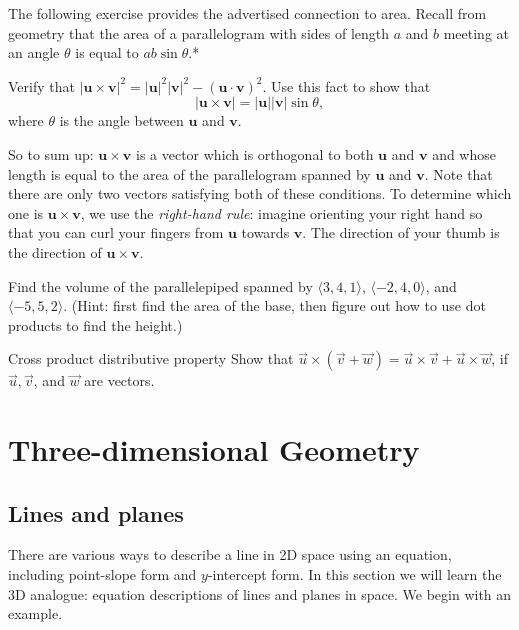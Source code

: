 \documentclass{watsonbook}
\begin{document}
The following exercise provides the advertised connection to
area. Recall from geometry that the area of a parallelogram with sides
of length $a$ and $b$ meeting at an angle $\theta$ is equal to $ab\sin
\theta$.*

\begin{exercise}{}{}
Verify that $|\mathbf{u} \times \mathbf{v}|^2 =
|\mathbf{u}|^2|\mathbf{v}|^2 - (\mathbf{u}\cdot \mathbf{v})^2$. Use this fact to
show that 
\[
|\mathbf{u} \times \mathbf{v}| = |\mathbf{u}||\mathbf{v}|\sin\theta,
\]
where $\theta$ is the angle between $\mathbf{u}$ and $\mathbf{v}$. 
\end{exercise}

So to sum up: $\mathbf{u}  \times \mathbf{v}$ is a vector which is
orthogonal to both $\mathbf{u}$ and $\mathbf{v}$ and whose length
is equal to the area of the parallelogram spanned by $\mathbf{u}$ and
$\mathbf{v}$. Note that there are only two vectors satisfying both of
these conditions. To determine which one is $\mathbf{u}  \times
\mathbf{v}$, we use the \textit{right-hand rule}: imagine orienting
your right hand so that you can curl your fingers from $\mathbf{u}$
towards $\mathbf{v}$. The direction of your thumb is the direction of
$\mathbf{u} \times \mathbf{v}$. 

\begin{exercise}{}{}
  Find the volume of the parallelepiped spanned by
  $\langle 3,4,1 \rangle$,  $\langle -2,4,0 \rangle$, and 
  $\langle -5,5,2 \rangle$. (Hint: first find the area of the base,
  then figure out how to use dot products to find the height.) 
\end{exercise}

\begin{exercise}{Cross product distributive property}{}
  Show that $\vec{u} \times (\vec{v} + \vec{w}) = \vec{u}\times
  \vec{v} + \vec{u} \times \vec{w}$, if $\vec{u}, \vec{v}$, and
  $\vec{w}$ are vectors. 
\end{exercise}

\chapter{Three-dimensional Geometry}

\section{Lines and planes} \label{sec:lines_and_planes} 
  
There are various ways to describe a line in 2D space using an
equation, including point-slope form and $y$-intercept form. In this
section we will learn the 3D analogue: equation descriptions of lines
and planes in space. We begin with an example.
\end{document}
